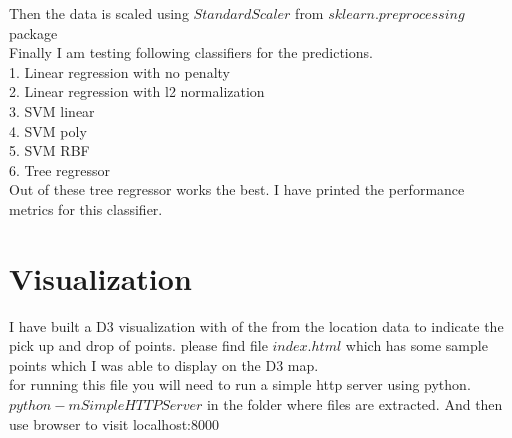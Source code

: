 \documentclass[letterpaper, 11pt]{article}
\begin{document}
Then the data is scaled using $StandardScaler$ from $sklearn.preprocessing$ package\\

Finally I am testing following classifiers for the predictions.\\

1. Linear regression with no penalty\\

2. Linear regression with l2 normalization\\

3. SVM linear\\
 
4. SVM poly\\
  
5. SVM RBF\\
  
6. Tree regressor\\

Out of these tree regressor works the best. I have printed the performance metrics for this classifier.

\section*{Visualization}

I have built a D3 visualization with of the from the location data to indicate the pick up and drop of points. please find file $index.html$ which has some sample points which I was able to display on the D3 map. \\
for running this file you will need to run a simple http server using python. 
$python -m SimpleHTTPServer$ in the folder where files are extracted.
And then use browser to visit localhost:8000
\end{document}

